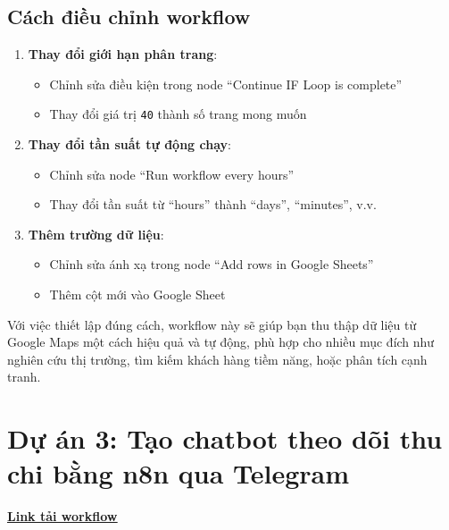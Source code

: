 \subsection{Cách điều chỉnh workflow}

\begin{enumerate}
  \item \textbf{Thay đổi giới hạn phân trang}:
  \begin{itemize}
    \item Chỉnh sửa điều kiện trong node ``Continue IF Loop is complete''
    \item Thay đổi giá trị \texttt{40} thành số trang mong muốn
  \end{itemize}

  \item \textbf{Thay đổi tần suất tự động chạy}:
  \begin{itemize}
    \item Chỉnh sửa node ``Run workflow every hours''
    \item Thay đổi tần suất từ ``hours'' thành ``days'', ``minutes'', v.v.
  \end{itemize}

  \item \textbf{Thêm trường dữ liệu}:
  \begin{itemize}
    \item Chỉnh sửa ánh xạ trong node ``Add rows in Google Sheets''
    \item Thêm cột mới vào Google Sheet
  \end{itemize}
\end{enumerate}

Với việc thiết lập đúng cách, workflow này sẽ giúp bạn thu thập dữ liệu từ Google Maps một cách hiệu quả và tự động, phù hợp cho nhiều mục đích như nghiên cứu thị trường, tìm kiếm khách hàng tiềm năng, hoặc phân tích cạnh tranh.

\clearpage
\section{\textbf{Dự án 3: Tạo chatbot theo dõi thu chi bằng n8n qua Telegram }}

\href{https://drive.google.com/drive/folders/1tumFktBej5fgHsKSuYDtnL2V0W5OI9nk?usp=sharing}{\textbf{\underline {Link tải workflow}}}

